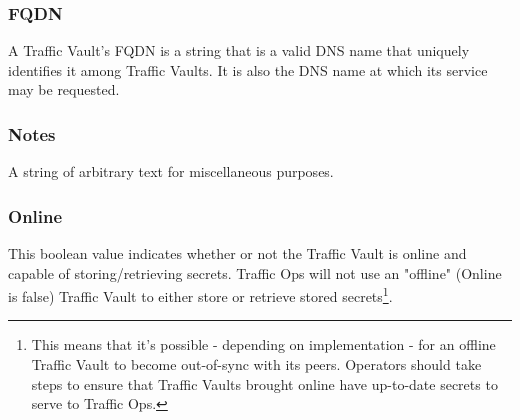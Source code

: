 \subsubsection{FQDN}
A Traffic Vault's FQDN is a string that is a valid DNS name that uniquely
identifies it among Traffic Vaults. It is also the DNS name at which its service
may be requested.

\subsubsection{Notes}
A string of arbitrary text for miscellaneous purposes.

\subsubsection{Online}
This boolean value indicates whether or not the Traffic Vault is online and
capable of storing/retrieving secrets. Traffic Ops will not use an "offline"
(Online is false) Traffic Vault to either store or retrieve stored
secrets\footnote{This means that it's possible - depending on implementation -
for an offline Traffic Vault to become out-of-sync with its peers. Operators
should take steps to ensure that Traffic Vaults brought online have up-to-date
secrets to serve to Traffic Ops.}.
